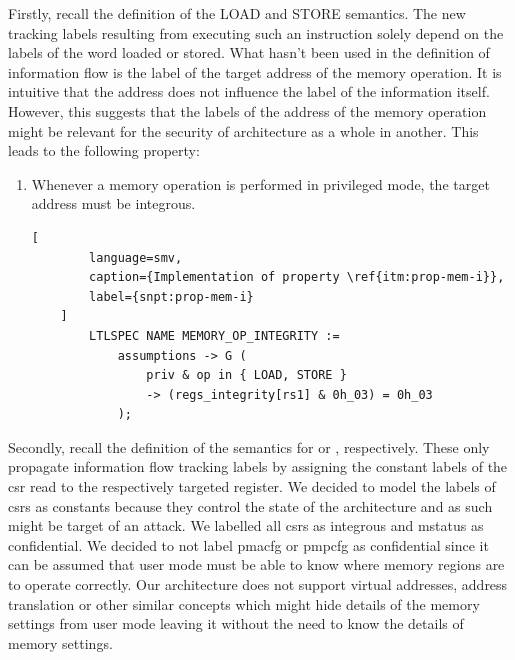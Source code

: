Firstly, recall the definition of the LOAD and STORE semantics.
The new tracking labels resulting from executing such an instruction solely depend on the labels of the word loaded or stored.
What hasn't been used in the definition of information flow is the label of the target address of the memory operation.
It is intuitive that the address does not influence the label of the information itself.
However, this suggests that the labels of the address of the memory operation might be relevant for the security of architecture as a whole in another.
This leads to the following property:
\begin{enumerate}[label=\Roman*.,series=]
    \item \label{itm:prop-mem-i}
    Whenever a memory operation is performed in privileged mode, the target address must be integrous.

    \begin{lstlisting}[
        language=smv,
        caption={Implementation of property \ref{itm:prop-mem-i}},
        label={snpt:prop-mem-i}
    ]
        LTLSPEC NAME MEMORY_OP_INTEGRITY :=
            assumptions -> G (
                priv & op in { LOAD, STORE }
                -> (regs_integrity[rs1] & 0h_03) = 0h_03
            );
    \end{lstlisting}
\end{enumerate}


Secondly, recall the definition of the semantics for  or , respectively.
These only propagate information flow tracking labels by assigning the constant labels of the \gls{csr} read to the respectively targeted register.
We decided to model the labels of \glspl{csr} as constants because they control the state of the architecture and as such might be target of an attack.
We labelled all \glspl{csr} as integrous and \gls{mstatus} as confidential.
We decided to not label \gls{pmacfg} or \gls{pmpcfg} as confidential since it can be assumed that user mode must be able to know where memory regions are to operate correctly.
Our architecture does not support virtual addresses, address translation or other similar concepts which might hide details of the memory settings from user mode leaving it without the need to know the details of memory settings.

